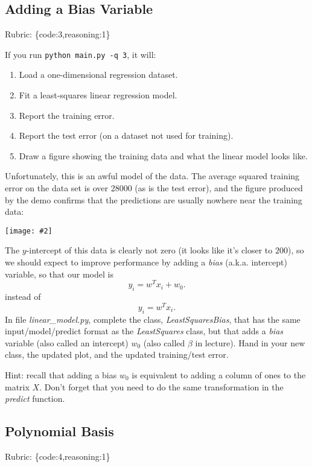 \documentclass{article}
\def\rubric#1{\gre{Rubric: \{#1\}}}{}
\def\blu#1{{\color{blu}#1}}
\def\gre#1{{\color{gre}#1}}
\newcommand{\centerfig}[2]{\begin{center}\texttt{[image: \#2]}\end{center}}
\def\enum#1{\begin{enumerate}#1\end{enumerate}}
\begin{document}
\subsection{Adding a Bias Variable}
\rubric{code:3,reasoning:1}

If you run  \verb|python main.py -q 3|, it will:
\enum{
\item Load a one-dimensional regression dataset.
\item Fit a least-squares linear regression model.
\item Report the training error.
\item Report the test error (on a dataset not used for training).
\item Draw a figure showing the training data and what the linear model looks like.
}
Unfortunately, this is an awful model of the data. The average squared training error on the data set is over 28000
(as is the test error), and the figure produced by the demo confirms that the predictions are usually nowhere near
 the training data:
\centerfig{.5}{../figs/least_squares_no_bias.pdf}
The $y$-intercept of this data is clearly not zero (it looks like it's closer to $200$),
so we should expect to improve performance by adding a \emph{bias} (a.k.a. intercept) variable, so that our model is
\[
y_i = w^Tx_i + w_0.
\]
instead of
\[
y_i = w^Tx_i.
\]
\blu{In file \emph{linear\_model.py}, complete the class, \emph{LeastSquaresBias}, 
that has the same input/model/predict format as the \emph{LeastSquares} class, 
but that adds a \emph{bias} variable (also called an intercept) $w_0$ (also called $\beta$ in lecture). Hand in your new class, the updated plot, 
and the updated training/test error.}

Hint: recall that adding a bias $w_0$ is equivalent to adding a column of ones to the matrix $X$. Don't forget that you need to do the same transformation in the \emph{predict} function.

\subsection{Polynomial Basis}
\rubric{code:4,reasoning:1}
\end{document}
